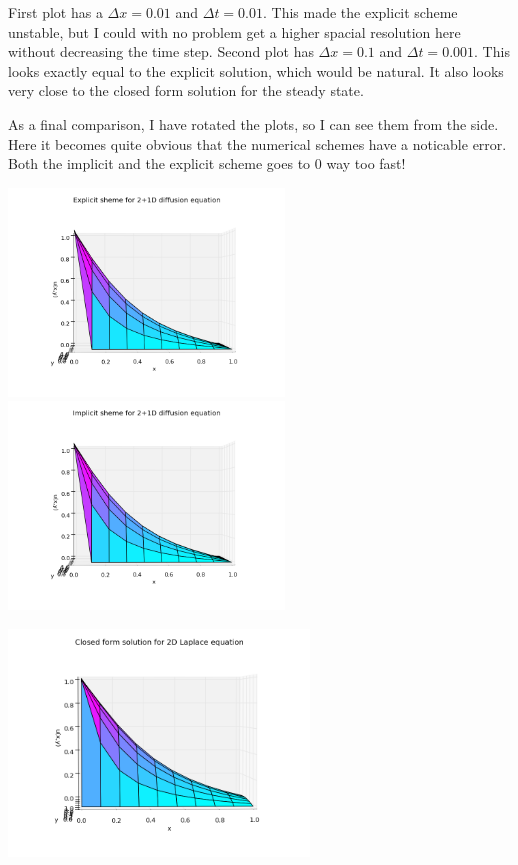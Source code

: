 \documentclass[a4paper, 12pt, titlepage]{article}
\begin{document}
\begin{section}
\begin{subsection}
   First plot has a $\Delta x = 0.01$ and $\Delta t = 0.01$. This made the explicit scheme unstable, but
   I could with no problem get a higher spacial resolution here without decreasing the time step.
   Second plot has $\Delta x = 0.1$ and $\Delta t = 0.001$. This looks exactly equal to the explicit 
   solution, which would be natural. It also looks very close to the closed form solution for the steady state.
   
   As a final comparison, I have rotated the plots, so I can see them from the side. Here it becomes quite 
   obvious that the numerical schemes have a noticable error. Both the implicit and the explicit scheme
   goes to 0 way too fast! 
   
   \includegraphics[width=0.55\textwidth]{build-main-Desktop-Debug/Explisit_side.png}
   \includegraphics[width=0.55\textwidth]{build-main-Desktop-Debug/Implicit_side.png}
   
   \includegraphics[width=0.6\textwidth]{build-main-Desktop-Debug/Analytic_side.png}
   \end{subsection}

  \end{section}
  
\end{document}
